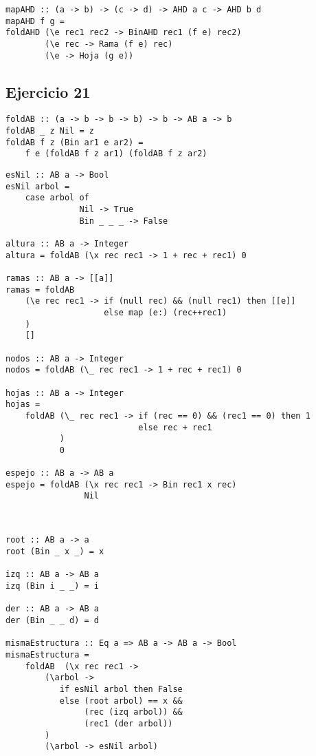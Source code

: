 \begin{centrado}
    \begin{verbatim}
mapAHD :: (a -> b) -> (c -> d) -> AHD a c -> AHD b d
mapAHD f g = 
foldAHD (\e rec1 rec2 -> BinAHD rec1 (f e) rec2)
        (\e rec -> Rama (f e) rec)
        (\e -> Hoja (g e))
    \end{verbatim}
\end{centrado}

\subsection{Ejercicio 21}
\begin{centrado}
    \begin{verbatim}
foldAB :: (a -> b -> b -> b) -> b -> AB a -> b
foldAB _ z Nil = z
foldAB f z (Bin ar1 e ar2) = 
    f e (foldAB f z ar1) (foldAB f z ar2)
    \end{verbatim}
\end{centrado}

\begin{centrado}
    \begin{verbatim}
esNil :: AB a -> Bool
esNil arbol = 
    case arbol of
               Nil -> True
               Bin _ _ _ -> False

altura :: AB a -> Integer
altura = foldAB (\x rec rec1 -> 1 + rec + rec1) 0

ramas :: AB a -> [[a]]
ramas = foldAB 
    (\e rec rec1 -> if (null rec) && (null rec1) then [[e]]
                    else map (e:) (rec++rec1)
    )
    []

nodos :: AB a -> Integer
nodos = foldAB (\_ rec rec1 -> 1 + rec + rec1) 0

hojas :: AB a -> Integer
hojas = 
    foldAB (\_ rec rec1 -> if (rec == 0) && (rec1 == 0) then 1
                           else rec + rec1
           )
           0

espejo :: AB a -> AB a
espejo = foldAB (\x rec rec1 -> Bin rec1 x rec)
                Nil
\end{verbatim}
\end{centrado}

\begin{centrado}
	\begin{verbatim}


root :: AB a -> a
root (Bin _ x _) = x

izq :: AB a -> AB a
izq (Bin i _ _) = i

der :: AB a -> AB a
der (Bin _ _ d) = d

mismaEstructura :: Eq a => AB a -> AB a -> Bool
mismaEstructura = 
    foldAB  (\x rec rec1 ->
        (\arbol ->
           if esNil arbol then False
           else (root arbol) == x && 
                (rec (izq arbol)) && 
                (rec1 (der arbol))
        )
        (\arbol -> esNil arbol)

	\end{verbatim}
\end{centrado}
